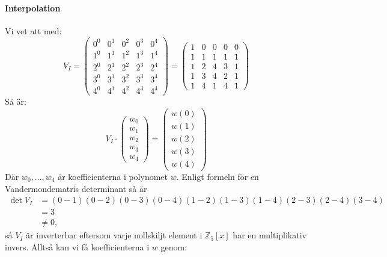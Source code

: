 \paragraph{Interpolation}
Vi vet att med:
\begin{equation*}
  V_I = \begin{pmatrix}
    0^0 & 0^1 & 0^2 & 0^3 & 0^4 \\
    1^0 & 1^1 & 1^2 & 1^3 & 1^4 \\
    2^0 & 2^1 & 2^2 & 2^3 & 2^4 \\
    3^0 & 3^1 & 3^2 & 3^3 & 3^4 \\
    4^0 & 4^1 & 4^2 & 4^3 & 4^4
  \end{pmatrix} =
  \begin{pmatrix}
    1 & 0 & 0 & 0 & 0 \\
    1 & 1 & 1 & 1 & 1 \\
    1 & 2 & 4 & 3 & 1 \\
    1 & 3 & 4 & 2 & 1 \\
    1 & 4 & 1 & 4 & 1
  \end{pmatrix}
\end{equation*}
Så är:
\begin{equation*}
  V_I \cdot \begin{pmatrix}
    w_0 \\
    w_1 \\
    w_2 \\
    w_3 \\
    w_4
  \end{pmatrix} =
  \begin{pmatrix}
    w(0) \\
    w(1) \\
    w(2) \\
    w(3) \\
    w(4)
  \end{pmatrix}
\end{equation*}
Där $w_0, ..., w_4$ är koefficienterna i polynomet $w$. Enligt formeln för en
Vandermondematris determinant så är
\begin{align*}
 \det V_I &= (0-1)(0-2)(0-3)(0-4)(1-2)(1-3)(1-4)(2-3)(2-4)(3-4) \\
          &= 3  \\
          &\neq 0,
\end{align*}
så $V_I$ är inverterbar eftersom varje nollskiljt element i $\mathbb{Z}_5[x]$ har en multiplikativ invers.
Alltså kan vi få
koefficienterna i $w$ genom:
